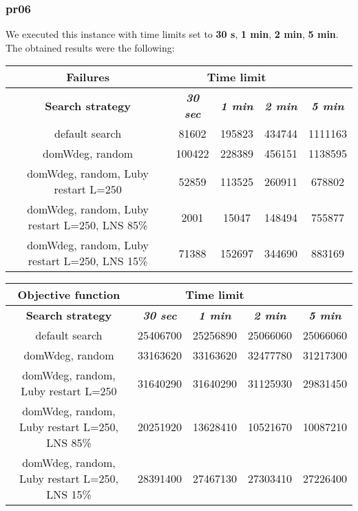 \subsubsection{pr06}
We executed this instance with time limits set to \textbf{30 s}, \textbf{1 min}, \textbf{2 min}, \textbf{5 min}.\\
The obtained results were the following:
{
\renewcommand{\arraystretch}{2}
\begin{longtable}[h]{| c | c | c | c | c |}
    \hline
    \textbf{Failures} & \multicolumn{3}{c}{Time limit} & \\
    \hline
    \textbf{Search strategy} & \textbf{\textit{30 sec}} & \textbf{\textit{1 min}} & \textbf{\textit{2 min}} & \textbf{\textit{5 min}} \\
    \hline
    \endhead
    default search                                &  81602 & 195823 & 434744 & 1111163 \\
    \hline
    domWdeg, random                               & 100422 & 228389 & 456151 & 1138595 \\
    \hline
    domWdeg, random, Luby restart L=250           &  52859 & 113525 & 260911 &  678802 \\
    \hline
    domWdeg, random, Luby restart L=250, LNS 85\% &   2001 &  15047 & 148494 &  755877 \\
    \hline
    domWdeg, random, Luby restart L=250, LNS 15\% &  71388 & 152697 & 344690 &  883169 \\
    \hline
\end{longtable}
}

{
\renewcommand{\arraystretch}{2}
\begin{longtable}[h]{| c | c | c | c | c |}
    \hline
    \textbf{Objective function} & \multicolumn{3}{c}{Time limit} & \\
    \hline
    \textbf{Search strategy} & \textbf{\textit{30 sec}} & \textbf{\textit{1 min}} & \textbf{\textit{2 min}} & \textbf{\textit{5 min}} \\
    \hline
    \endhead
    default search                                & 25406700 & 25256890 & 25066060 & 25066060 \\
    \hline
    domWdeg, random                               & 33163620 & 33163620 & 32477780 & 31217300 \\
    \hline
    domWdeg, random, Luby restart L=250           & 31640290 & 31640290 & 31125930 & 29831450 \\
    \hline
    domWdeg, random, Luby restart L=250, LNS 85\% & 20251920 & 13628410 & 10521670 & 10087210 \\
    \hline
    domWdeg, random, Luby restart L=250, LNS 15\% & 28391400 & 27467130 & 27303410 & 27226400 \\
    \hline
\end{longtable}
}